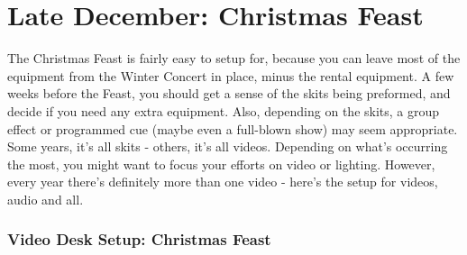 \documentclass[11pt,a4paper]{book}
\begin{document}
\chapter{Late December: Christmas Feast}
The Christmas Feast is fairly easy to setup for, because you can leave most of the equipment from the Winter Concert in place, minus the rental equipment. A few weeks before the Feast, you should get a sense of the skits being preformed, and decide if you need any extra equipment. Also, depending on the skits, a group effect or programmed cue (maybe even a full-blown show) may seem appropriate. Some years, it's all skits - others, it's all videos. Depending on what's occurring the most, you might want to focus your efforts on video or lighting. However, every year there's definitely more than one video - here's the setup for videos, audio and all.

\subsection{Video Desk Setup: Christmas Feast}
\end{document}
